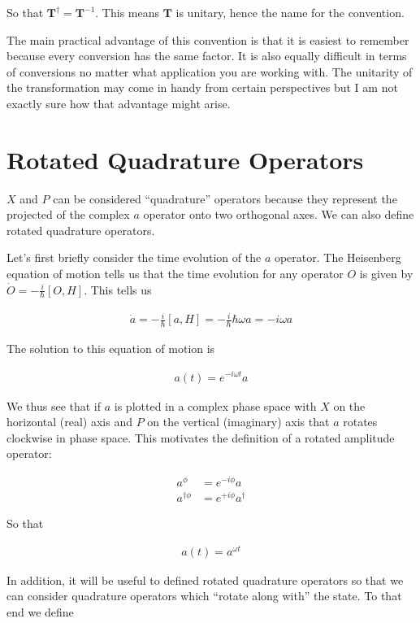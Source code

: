 \documentclass[12pt]{article}
\newcommand{\bv}[1]{\boldsymbol{#1}}
\begin{document}
So that $\bv{T}^{\dag} = \bv{T}^{-1}$. This means $\bv{T}$ is unitary, hence the name for the convention.

The main practical advantage of this convention is that it is easiest to remember because every conversion has the same factor. It is also equally difficult in terms of conversions no matter what application you are working with. The unitarity of the transformation may come in handy from certain perspectives but I am not exactly sure how that advantage might arise.

\section{Rotated Quadrature Operators}

$X$ and $P$ can be considered ``quadrature'' operators because they represent the projected of the complex $a$ operator onto two orthogonal axes. We can also define rotated quadrature operators.

Let's first briefly consider the time evolution of the $a$ operator. The Heisenberg equation of motion tells us that the time evolution for any operator $O$ is given by $\dot{O} = -\frac{i}{\hbar}[O,H]$. This tells us

\begin{align}
\dot{a} = -\frac{i}{\hbar}[a, H] = -\frac{i}{\hbar} \hbar \omega a = -i\omega a
\end{align}

The solution to this equation of motion is

\begin{align}
a(t) = e^{-i\omega t}a
\end{align}

We thus see that if $a$ is plotted in a complex phase space with $X$ on the horizontal (real) axis and $P$ on the vertical (imaginary) axis that $a$ rotates clockwise in phase space. This motivates the definition of a rotated amplitude operator:

\begin{align}
a^{\phi} &= e^{-i\phi}a\\
a^{\dag \phi} &= e^{+i\phi}a^{\dag}
\end{align}

So that

\begin{align}
a(t) = a^{\omega t}
\end{align}

In addition, it will be useful to defined rotated quadrature operators so that we can consider quadrature operators which ``rotate along with'' the state. To that end we define
\end{document}
